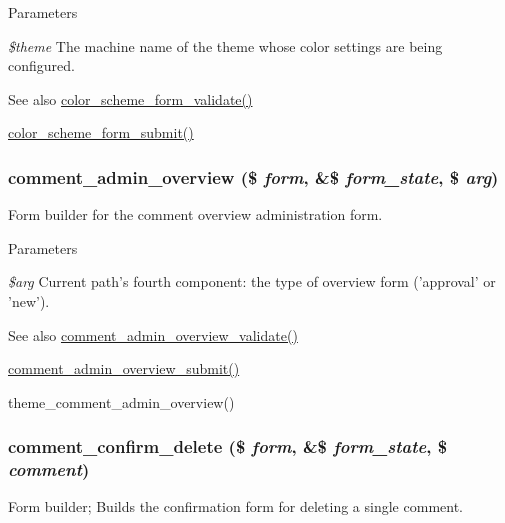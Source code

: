 \begin{DoxyParams}{Parameters}
\item[{\em \$theme}]The machine name of the theme whose color settings are being configured.\end{DoxyParams}
\begin{DoxySeeAlso}{See also}
\hyperlink{color_8module_a1cc79136887d4ca5fdd82e8362d78f15}{color\_\-scheme\_\-form\_\-validate()} 

\hyperlink{color_8module_a995f86a47f2e1456f113aa80c37b9a32}{color\_\-scheme\_\-form\_\-submit()} 
\end{DoxySeeAlso}
\hypertarget{group__forms_ga73d86cbdbe6e2e14ca63fa234e9789b3}{
\subsubsection[{comment\_\-admin\_\-overview}]{\setlength{\rightskip}{0pt plus 5cm}comment\_\-admin\_\-overview (\$ {\em form}, \/  \&\$ {\em form\_\-state}, \/  \$ {\em arg})}}
\label{group__forms_ga73d86cbdbe6e2e14ca63fa234e9789b3}
Form builder for the comment overview administration form.


\begin{DoxyParams}{Parameters}
\item[{\em \$arg}]Current path's fourth component: the type of overview form ('approval' or 'new').\end{DoxyParams}
\begin{DoxySeeAlso}{See also}
\hyperlink{comment_8admin_8inc_a60a994bc18cf6f4a9a71a478700f973e}{comment\_\-admin\_\-overview\_\-validate()} 

\hyperlink{comment_8admin_8inc_ae242a86117c7b818ad449f42dd63706c}{comment\_\-admin\_\-overview\_\-submit()} 

theme\_\-comment\_\-admin\_\-overview() 
\end{DoxySeeAlso}
\hypertarget{group__forms_gae661cbb8f0f988f538980296a6f062c8}{
\subsubsection[{comment\_\-confirm\_\-delete}]{\setlength{\rightskip}{0pt plus 5cm}comment\_\-confirm\_\-delete (\$ {\em form}, \/  \&\$ {\em form\_\-state}, \/  \$ {\em comment})}}
\label{group__forms_gae661cbb8f0f988f538980296a6f062c8}
Form builder; Builds the confirmation form for deleting a single comment.

